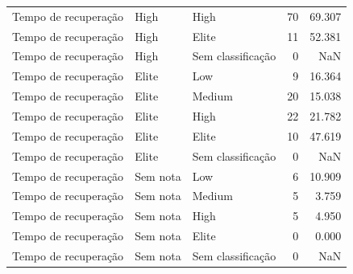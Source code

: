 \begin{tabular}{lllrr}
Tempo de recuperação & High & High & 70 & 69.307 \\
Tempo de recuperação & High & Elite & 11 & 52.381 \\
Tempo de recuperação & High & Sem classificação & 0 & NaN \\
Tempo de recuperação & Elite & Low & 9 & 16.364 \\
Tempo de recuperação & Elite & Medium & 20 & 15.038 \\
Tempo de recuperação & Elite & High & 22 & 21.782 \\
Tempo de recuperação & Elite & Elite & 10 & 47.619 \\
Tempo de recuperação & Elite & Sem classificação & 0 & NaN \\
Tempo de recuperação & Sem nota & Low & 6 & 10.909 \\
Tempo de recuperação & Sem nota & Medium & 5 & 3.759 \\
Tempo de recuperação & Sem nota & High & 5 & 4.950 \\
Tempo de recuperação & Sem nota & Elite & 0 & 0.000 \\
Tempo de recuperação & Sem nota & Sem classificação & 0 & NaN \\
\bottomrule
\end{tabular}
